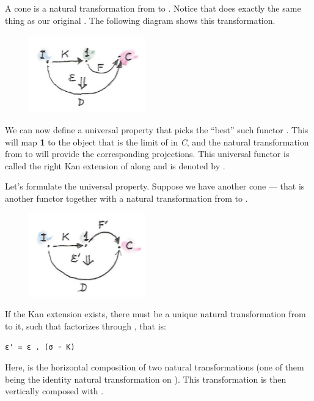 \noindent
A cone is a natural transformation  from  to
. Notice that  does exactly the same thing as
our original . The following diagram shows this
transformation.

\begin{figure}[H]
\centering
\includegraphics[width=50mm]{images/kan3-e1492120491591.jpg}
\end{figure}

\noindent
We can now define a universal property that picks the ``best'' such
functor . This  will map \textbf{1} to the object
that is the limit of  in \emph{C}, and the natural
transformation  from  to  will
provide the corresponding projections. This universal functor is called
the right Kan extension of  along  and is denoted by
.

Let's formulate the universal property. Suppose we have another cone ---
that is another functor  together with a natural
transformation  from  to
.

\begin{figure}[H]
\centering
\includegraphics[width=50mm]{images/kan31-e1492120512209.jpg}
\end{figure}

\noindent
If the Kan extension  exists, there must be a unique
natural transformation  from  to it, such
that  factorizes through , that is:

\begin{Verbatim}[commandchars=\\\{\}]
ε' = ε . (σ ◦ K)
\end{Verbatim}
Here,  is the horizontal composition of two natural
transformations (one of them being the identity natural transformation
on ). This transformation is then vertically composed with
.

